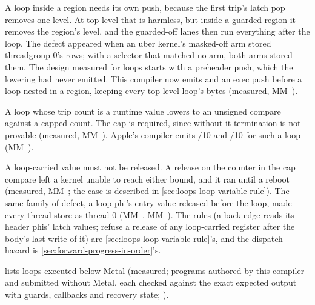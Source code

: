 A loop inside a region needs its own push, because the first trip's latch pop removes one level. At top level that is
harmless, but inside a guarded region it removes the region's level, and the guarded-off lanes then run everything after
the loop. The defect appeared when an uber kernel's masked-off arm stored threadgroup 0's rows; with a selector that matched no
arm, both arms stored them. The design measured for loops starts with a preheader push, which the lowering had never
emitted. This compiler now emits  and an exec push before a loop nested in a region, keeping every top-level loop's bytes
(measured, MM~).

A loop whose trip count is a runtime value lowers to an unsigned compare against a capped
count. The cap is required, since without it termination is not provable (measured, MM~). Apple's compiler emits /10 and /10 for such a loop
(MM~).

A loop-carried value must not be released. A release on the counter in the cap compare left a kernel unable to reach
either bound, and it ran until a reboot (measured, MM~; the case is described in
\cref{sec:loops-loop-variable-rule}). The same
family of defect, a loop phi's entry value released before the loop, made every thread store as thread 0 (MM~,
MM~). The rules (a back edge reads its header phis' latch values; refuse a release of any loop-carried register
after the body's last write of it) are \cref{sec:loops-loop-variable-rule}'s, and the dispatch hazard is \cref{sec:forward-progress-in-order}'s.

 lists loops executed below Metal (measured; programs authored by this compiler and submitted without Metal, each checked
against the exact expected output with guards, callbacks and recovery state; ).

